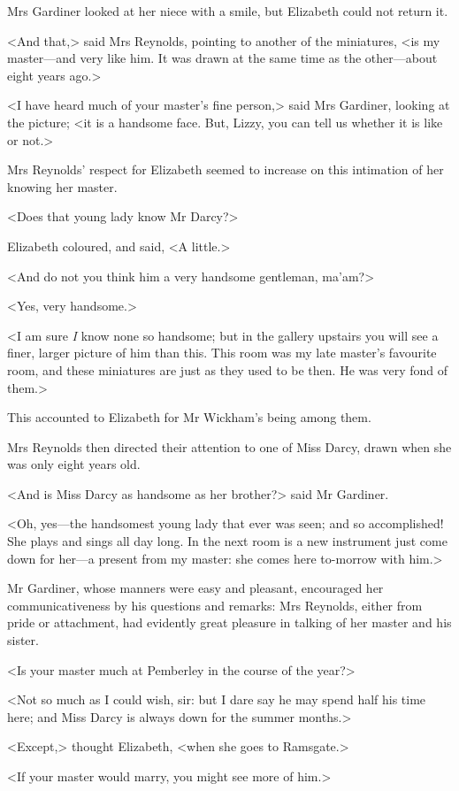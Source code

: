 Mrs Gardiner looked at her niece with a smile, but Elizabeth could not return it.

<And that,> said Mrs Reynolds, pointing to another of the miniatures, <is my master—and very like him. It was drawn at the same time as the other—about eight years ago.>

<I have heard much of your master's fine person,> said Mrs Gardiner, looking at the picture; <it is a handsome face. But, Lizzy, you can tell us whether it is like or not.>

Mrs Reynolds' respect for Elizabeth seemed to increase on this intimation of her knowing her master.

<Does that young lady know Mr Darcy?>

Elizabeth coloured, and said, <A little.>

<And do not you think him a very handsome gentleman, ma'am?>

<Yes, very handsome.>

<I am sure \textit{I} know none so handsome; but in the gallery upstairs you will see a finer, larger picture of him than this. This room was my late master's favourite room, and these miniatures are just as they used to be then. He was very fond of them.>

This accounted to Elizabeth for Mr Wickham's being among them.

Mrs Reynolds then directed their attention to one of Miss Darcy, drawn when she was only eight years old.

<And is Miss Darcy as handsome as her brother?> said Mr Gardiner.

<Oh, yes—the handsomest young lady that ever was seen; and so accomplished! She plays and sings all day long. In the next room is a new instrument just come down for her—a present from my master: she comes here to-morrow with him.>

Mr Gardiner, whose manners were easy and pleasant, encouraged her communicativeness by his questions and remarks: Mrs Reynolds, either from pride or attachment, had evidently great pleasure in talking of her master and his sister.

<Is your master much at Pemberley in the course of the year?>

<Not so much as I could wish, sir: but I dare say he may spend half his time here; and Miss Darcy is always down for the summer months.>

<Except,> thought Elizabeth, <when she goes to Ramsgate.>

<If your master would marry, you might see more of him.>

